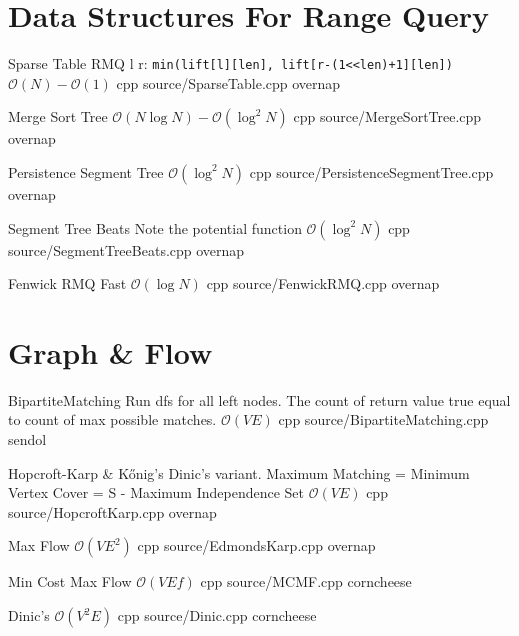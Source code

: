 \documentclass[landscape, 10pt, a4paper, oneside, twocolumn]{extarticle}
\begin{document}
\maketitlepage



\section{Data Structures For Range Query}


\Algorithm
{Sparse Table}
{RMQ l r: \texttt{min(lift[l][len], lift[r-(1<<len)+1][len])}}
{$\mathcal{O}(N)-\mathcal{O}(1)$}
{cpp}
{source/SparseTable.cpp}
{overnap}

\Algorithm
{Merge Sort Tree}
{}
{$\mathcal{O}(N\log{N})-\mathcal{O}(\log^2{N})$}
{cpp}
{source/MergeSortTree.cpp}
{overnap}


\Algorithm
{Persistence Segment Tree}
{}
{$\mathcal{O}(\log^2{N})$}
{cpp}
{source/PersistenceSegmentTree.cpp}
{overnap}

\Algorithm
{Segment Tree Beats}
{Note the potential function}
{$\mathcal{O}(\log^2{N})$}
{cpp}
{source/SegmentTreeBeats.cpp}
{overnap}

\Algorithm
{Fenwick RMQ}
{}
{Fast $\mathcal{O}(\log{N})$}
{cpp}
{source/FenwickRMQ.cpp}
{overnap}

\section{Graph \& Flow}

\Algorithm
{BipartiteMatching}
{Run dfs for all left nodes. The count of return value true equal to count of max possible matches.}
{$\mathcal{O}(VE)$}
{cpp}
{source/BipartiteMatching.cpp}
{sendol}

\Algorithm
{Hopcroft-Karp \& Kőnig's}
{Dinic's variant. Maximum Matching = Minimum Vertex Cover = S - Maximum Independence Set}
{$\mathcal{O}(VE)$}
{cpp}
{source/HopcroftKarp.cpp}
{overnap}

\Algorithm
{Max Flow}
{}
{$\mathcal{O}(VE^2)$}
{cpp}
{source/EdmondsKarp.cpp}
{overnap}

\Algorithm
{Min Cost Max Flow}
{}
{$\mathcal{O}(VEf)$}
{cpp}
{source/MCMF.cpp}
{corncheese}

\Algorithm
{Dinic's}
{}
{$\mathcal{O}(V^2E)$}
{cpp}
{source/Dinic.cpp}
{corncheese}
\end{document}
